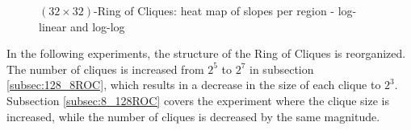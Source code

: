 \begin{figure}[!ht]
    \centering
    \hfil
    \caption{$(32\times32)$-Ring of Cliques: heat map of slopes per region - log-linear and log-log}
        \label{fig:ringOfCliquesslopes}
\end{figure}

In the following experiments, the structure of the Ring of Cliques is reorganized. The number of cliques is increased from $2^{5}$ to $2^{7}$ in subsection \ref{subsec:128_8ROC}, which results in a decrease in the size of each clique to $2^{3}$. Subsection \ref{subsec:8_128ROC} covers the experiment where the clique size is increased, while the number of cliques is decreased by the same magnitude.

